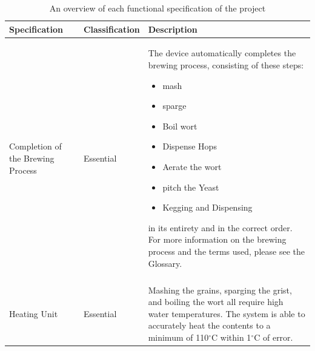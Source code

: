 \documentclass{article}
\begin{document}
\begin{table}[H]
\caption{An overview of each functional specification of the project}
\centering
\begin{tabularx}{\textwidth}{l l Z}
\toprule
\textbf{Specification} & \textbf{Classification} & \textbf{Description} \\ 
\midrule
Completion of the Brewing Process
& Essential	
& The device automatically completes the brewing process, consisting of these steps:
\begin{itemize}
\item \Gls{mash}
\item \Gls{sparge}
\item Boil \Gls{wort}
\item Dispense Hops
\item Aerate the \Gls{wort}
\item \Gls{pitch} the Yeast
\item Kegging and Dispensing
\end{itemize}
\noindent in its entirety and in the correct order.  For more information on the brewing process and the terms used, please see the Glossary.
\\\\
Heating Unit
& Essential
& Mashing the grains, sparging the \gls{grist}, and boiling the \gls{wort} all require high water temperatures. The system is able to accurately heat the contents to a minimum of 110$^{\circ}$C within 1$^{\circ}$C of error.
\\
\end{tabularx}
\end{table}
\end{document}
